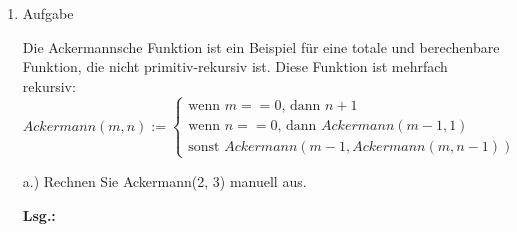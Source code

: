 \documentclass[12pt,a4paper]{scrreprt}
\newcommand{\Lsg}{\par \textbf{Lsg.: } \hfill}
\begin{document}
\begin{enumerate}
\begin{comment}
\begin{lstlisting}
unsigned long long fibi(unsigned char n){
	unsigned long long *f;
	unsigned long long i,r;
	if(n<=14)return (unsigned long long)n;
	f=(unsigned long long*)malloc((n+1)*sizeof(unsigned lon long));
	f[0]=0ULL;//zwei elm reichen statt 
	f[1]=1ULL;
	for(i=2U ; i<=n ; i++){
		f[i]=f[i-1]+f[i-1];
	}
	r=f[n];
	free(f);
	return f[i-1];
}
\end{lstlisting}

\end{comment}

\item Aufgabe %

Die Ackermannsche Funktion ist ein Beispiel für eine totale und berechenbare Funktion, die nicht primitiv-rekursiv ist. Diese Funktion ist mehrfach rekursiv:
$Ackermann(m, n) := \begin{cases}
\text{wenn } m == 0\text{, dann } n + 1 \\
\text{wenn } n == 0\text{, dann } Ackermann( m - 1, 1) \\
\text{sonst } Ackermann(m-1, Ackermann(m, n-1))
\end{cases}$

a.) Rechnen Sie Ackermann(2, 3) manuell aus.

\Lsg


\end{enumerate}
\end{document}
